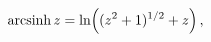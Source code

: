 \[\mathop{\mathrm{arcsinh}\/}\nolimits z=\mathop{\ln\/}\nolimits\!\left((z^{2}+1%
)^{1/2}+z\right),\]